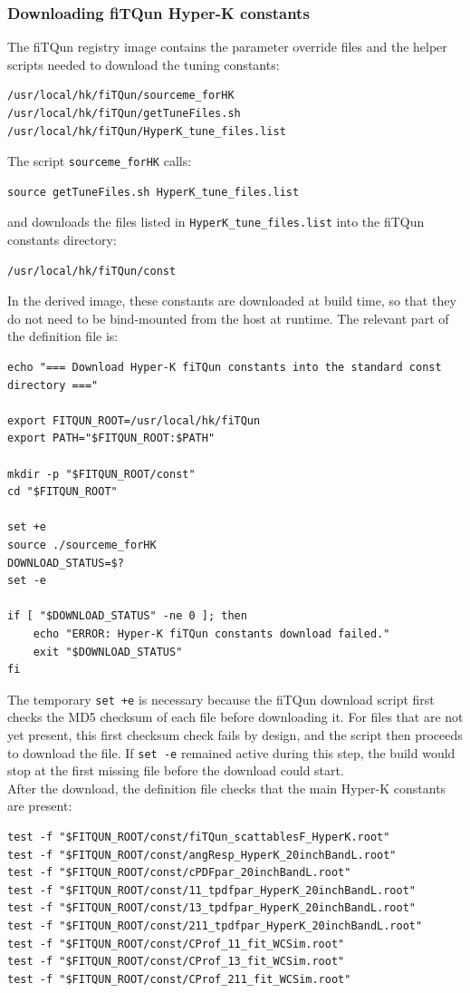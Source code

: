 \documentclass{article}
\numberwithin{table}{subsection}
\numberwithin{figure}{subsection}
\numberwithin{equation}{subsection}
\numberwithin{footnote}{subsection}
\begin{document}
\subsubsection{Downloading fiTQun Hyper-K constants}
\label{subsec:fitqun_constants}

The fiTQun registry image contains the parameter override files and the helper scripts needed to download the tuning constants:
\begin{lstlisting}[style=terminal]
/usr/local/hk/fiTQun/sourceme_forHK
/usr/local/hk/fiTQun/getTuneFiles.sh
/usr/local/hk/fiTQun/HyperK_tune_files.list
\end{lstlisting}
The script \texttt{sourceme\_forHK} calls:
\begin{lstlisting}[style=terminal]
source getTuneFiles.sh HyperK_tune_files.list
\end{lstlisting}
and downloads the files listed in \texttt{HyperK\_tune\_files.list} into the fiTQun constants directory:
\begin{lstlisting}[style=terminal]
/usr/local/hk/fiTQun/const
\end{lstlisting}
In the derived image, these constants are downloaded at build time, so that they do not need to be bind-mounted from the host at runtime. The relevant part of the definition file is:
\begin{lstlisting}[style=defstyle]
echo "=== Download Hyper-K fiTQun constants into the standard const directory ==="

export FITQUN_ROOT=/usr/local/hk/fiTQun
export PATH="$FITQUN_ROOT:$PATH"

mkdir -p "$FITQUN_ROOT/const"
cd "$FITQUN_ROOT"

set +e
source ./sourceme_forHK
DOWNLOAD_STATUS=$?
set -e

if [ "$DOWNLOAD_STATUS" -ne 0 ]; then
    echo "ERROR: Hyper-K fiTQun constants download failed."
    exit "$DOWNLOAD_STATUS"
fi
\end{lstlisting}
The temporary \texttt{set +e} is necessary because the fiTQun download script first checks the MD5 checksum of each file before downloading it. For files that are not yet present, this first checksum check fails by design, and the script then proceeds to download the file. If \texttt{set -e} remained active during this step, the build would stop at the first missing file before the download could start.\\
After the download, the definition file checks that the main Hyper-K constants are present:
\begin{lstlisting}[style=defstyle]
test -f "$FITQUN_ROOT/const/fiTQun_scattablesF_HyperK.root"
test -f "$FITQUN_ROOT/const/angResp_HyperK_20inchBandL.root"
test -f "$FITQUN_ROOT/const/cPDFpar_20inchBandL.root"
test -f "$FITQUN_ROOT/const/11_tpdfpar_HyperK_20inchBandL.root"
test -f "$FITQUN_ROOT/const/13_tpdfpar_HyperK_20inchBandL.root"
test -f "$FITQUN_ROOT/const/211_tpdfpar_HyperK_20inchBandL.root"
test -f "$FITQUN_ROOT/const/CProf_11_fit_WCSim.root"
test -f "$FITQUN_ROOT/const/CProf_13_fit_WCSim.root"
test -f "$FITQUN_ROOT/const/CProf_211_fit_WCSim.root"
\end{lstlisting}
\end{document}

